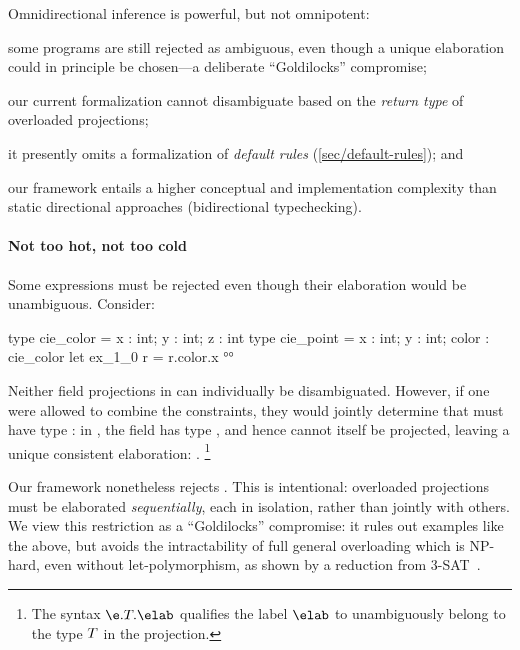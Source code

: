 \documentclass[acmsmall,screen,nonacm%
\Anonymous{,anonymous}{}%
\Final{}{,review}%
]{acmart}
\begin{document}
Omnidirectional inference is powerful, but not omnipotent:
\begin{enumerate*}

  \item some programs are still rejected as ambiguous, even though a unique
    elaboration could in principle be chosen---a deliberate ``Goldilocks''
    compromise;

  \item our current formalization cannot disambiguate based on the \emph{return
    type} of overloaded projections;

  \item it presently omits a formalization of \emph{default rules}
    (\cref{sec/default-rules}); and

  \item our framework entails a higher conceptual and implementation complexity
    than static directional approaches (\eg bidirectional typechecking).

\end{enumerate*}

\paragraph{Not too hot, not too cold} Some expressions
must be rejected even though their elaboration would be unambiguous. Consider:
\begin{program}
type cie_color = { x : int; y : int; z : int }
type cie_point = { x : int; y : int; color : cie_color }
let ex_1_0 r = r.color.x °°
\end{program}
Neither field projections in  can individually be
disambiguated. However, if one were allowed to combine the constraints, they
would jointly determine that  must have type : in
, the field  has type , and hence
cannot itself be projected, leaving a unique consistent elaboration:
.%
%
\footnote{
The syntax $\exfield \e \T \elab$ qualifies the label $\elab$ to unambiguously
belong to the type $T$ in the projection.
}

Our framework nonetheless rejects . This is intentional:
overloaded projections must be elaborated \emph{sequentially}, each in isolation,
rather than jointly with others. We view this restriction as a
``Goldilocks'' compromise: it rules out examples like the above, but avoids
the intractability of full general overloading which is NP-hard, even
without let-polymorphism, as shown by a reduction from 3-SAT~\citep*
{Chargueraud-Bodin-Dunfield-Riboulet/jfla2025}.
\end{document}
